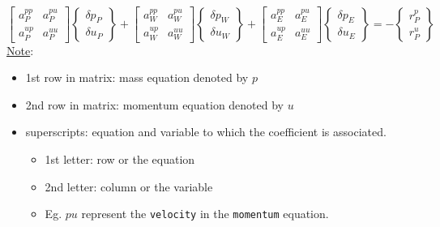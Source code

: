 \documentclass[11pt]{article}
\begin{document}
\begin{equation*}
\begin{bmatrix} a_P^{pp} & a_P^{pu} \\ a_P^{up} & a_P^{uu} \end{bmatrix}
\begin{Bmatrix} \delta p_P\\\delta u_P \end{Bmatrix}
+
\begin{bmatrix} a_W^{pp} & a_W^{pu} \\ a_W^{up} & a_W^{uu} \end{bmatrix}
\begin{Bmatrix} \delta p_W\\\delta u_W \end{Bmatrix}
+
\begin{bmatrix} a_E^{pp} & a_E^{pu} \\ a_E^{up} & a_E^{uu} \end{bmatrix}
\begin{Bmatrix} \delta p_E\\\delta u_E \end{Bmatrix}
=
-\begin{Bmatrix} r_P^p\\ r_P^u \end{Bmatrix}
\end{equation*}
\uline{Note}:
\begin{itemize}
\item 1st row in matrix: mass equation denoted by \(p\)
\item 2nd row in matrix: momentum equation denoted by \(u\)
\item superscripts: equation and variable to which the coefficient is associated.
\begin{itemize}
\item 1st letter: row or the equation
\item 2nd letter: column or the variable
\item Eg. \(pu\) represent the \texttt{velocity} in the \texttt{momentum} equation.
\end{itemize}
\end{itemize}
\end{document}
